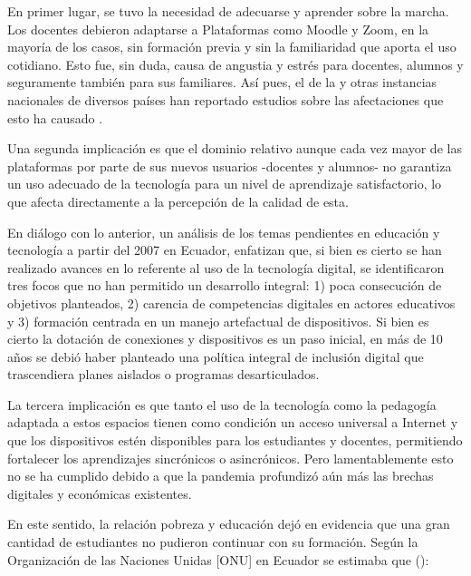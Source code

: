 \documentclass{textolivre}
\begin{document}
En primer lugar, se tuvo la necesidad de adecuarse y aprender sobre la marcha. Los docentes debieron adaptarse a Plataformas como Moodle y Zoom, en la mayoría de los casos, sin formación previa y sin la familiaridad que aporta el uso cotidiano. Esto fue, sin duda, causa de angustia y estrés para docentes, alumnos y seguramente también para sus familiares. Así pues, el \textcite{laboratorio_latinoamericano_de_evaluacion_de_la_calidad_de_la_educacion_[llece]_sistemas_2020} de la \textcite{unesco_bid_2020} y otras instancias nacionales de diversos países han reportado estudios sobre las afectaciones que esto ha causado \cite{unesco_bid_2020}.

Una segunda implicación es que el dominio relativo aunque cada vez mayor de las plataformas por parte de sus nuevos usuarios -docentes y alumnos- no garantiza un uso adecuado de la tecnología para un nivel de aprendizaje satisfactorio, lo que afecta directamente a la percepción de la calidad de esta. 

En diálogo con lo anterior, un análisis de los temas pendientes en educación y tecnología a partir del 2007 en Ecuador, \textcite{apolo_pending_2020a} enfatizan que, si bien es cierto se han realizado avances en lo referente al uso de la tecnología digital, se identificaron tres focos que no han permitido un desarrollo integral: 1) poca consecución de objetivos planteados, 2) carencia de competencias digitales en actores educativos y 3) formación centrada en un manejo artefactual de dispositivos. Si bien es cierto la dotación de conexiones y dispositivos es un paso inicial, en más de 10 años se debió haber planteado una política integral de inclusión digital que trascendiera planes aislados o programas desarticulados.

La tercera implicación es que tanto el uso de la tecnología como la pedagogía adaptada a estos espacios tienen como condición un acceso universal a Internet y que los dispositivos estén disponibles para los estudiantes y docentes, permitiendo fortalecer los aprendizajes sincrónicos o asincrónicos. Pero lamentablemente esto no se ha cumplido debido a que la pandemia profundizó aún más las brechas digitales y económicas existentes.

En este sentido, la relación pobreza y educación dejó en evidencia que una gran cantidad de estudiantes no pudieron continuar con su formación. Según la Organización de las Naciones Unidas [ONU] en Ecuador se estimaba que ():
\end{document}

